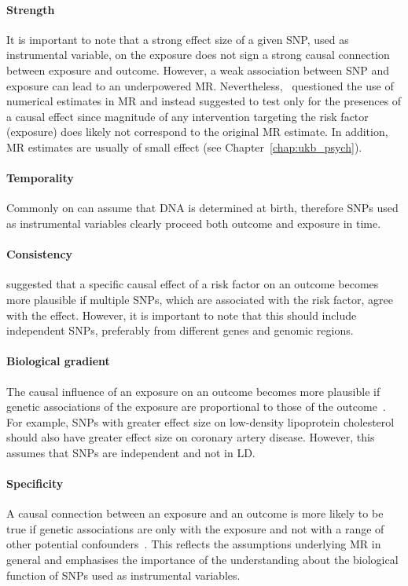 \paragraph{Strength}
\label{par:strength}
It is important to note that a strong effect size of a given SNP, used as instrumental variable, on the exposure does not sign a strong causal connection between exposure and outcome.
However, a weak association between SNP and exposure can lead to an underpowered MR\@.
Nevertheless,~\citet{Vanderweele2015} questioned the use of  numerical estimates in MR and instead suggested to test only for the presences of a causal effect since magnitude of any intervention targeting the risk factor (exposure) does likely not correspond to the original MR estimate.
In addition, MR estimates are usually of small effect (see Chapter~\ref{chap:ukb_psych}). 

\paragraph{Temporality}
\label{par:temporality}
Commonly on can assume that DNA is determined at birth, therefore SNPs used as instrumental variables clearly proceed both outcome and exposure in time.

\paragraph{Consistency}
\label{par:consistency}
\citet{Burgess2016a} suggested that a specific causal effect of a risk factor on an outcome becomes more plausible if multiple SNPs, which are associated with the risk factor, agree with the effect.
However, it is important to note that this should include independent SNPs, preferably from different genes and genomic regions.

\paragraph{Biological gradient}
\label{par:biological_gradient}
The causal influence of an exposure on an outcome becomes more plausible if genetic associations of the exposure are proportional to those of the outcome~\cite{Burgess2016a}.
For example, SNPs with greater effect size on low-density lipoprotein cholesterol should also have greater effect size on coronary artery disease.
However, this assumes that SNPs are independent and not in LD\@.

\paragraph{Specificity}
\label{par:specificity}
A causal connection between an exposure and an outcome is more likely to be true if genetic associations are only with the exposure and not with a range of other potential confounders~\cite{Burgess2016a}.
This reflects the assumptions underlying MR in general and emphasises the importance of the understanding about the biological function of SNPs used as instrumental variables.

